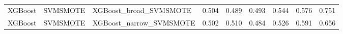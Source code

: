\begin{tabular}{lllllllll}
                     XGBoost &            SVMSMOTE &                       XGBoost\_broad\_SVMSMOTE & 0.504 &                     0.489 &                 0.493 &                  0.544 &                                   0.576 &     0.751 \\
                     XGBoost &            SVMSMOTE &                      XGBoost\_narrow\_SVMSMOTE & 0.502 &                     0.510 &                 0.484 &                  0.526 &                                   0.591 &     0.656 \\
\bottomrule
\end{tabular}
